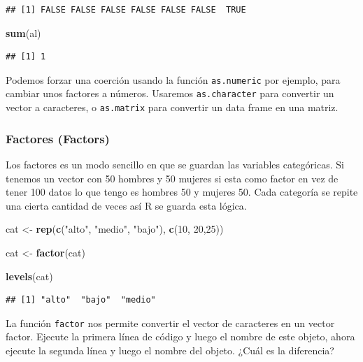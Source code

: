 \documentclass[]{article}
\newenvironment{Shaded}{\begin{snugshade}}{\end{snugshade}}
\newcommand{\KeywordTok}[1]{\textcolor[rgb]{0.13,0.29,0.53}{\textbf{{#1}}}}
\newcommand{\DecValTok}[1]{\textcolor[rgb]{0.00,0.00,0.81}{{#1}}}
\newcommand{\StringTok}[1]{\textcolor[rgb]{0.31,0.60,0.02}{{#1}}}
\newcommand{\NormalTok}[1]{{#1}}
\begin{document}
\begin{verbatim}
## [1] FALSE FALSE FALSE FALSE FALSE FALSE  TRUE
\end{verbatim}

\begin{Shaded}
\begin{Highlighting}[]
\KeywordTok{sum}\NormalTok{(al)}
\end{Highlighting}
\end{Shaded}

\begin{verbatim}
## [1] 1
\end{verbatim}

Podemos forzar una coerción usando la función \texttt{as.numeric} por
ejemplo, para cambiar unos factores a números. Usaremos
\texttt{as.character} para convertir un vector a caracteres, o
\texttt{as.matrix} para convertir un data frame en una matriz.

\subsubsection{Factores (Factors)}\label{factores-factors}

Los factores es un modo sencillo en que se guardan las variables
categóricas. Si tenemos un vector con 50 hombres y 50 mujeres si esta
como factor en vez de tener 100 datos lo que tengo es hombres 50 y
mujeres 50. Cada categoría se repite una cierta cantidad de veces así R
se guarda esta lógica.

\begin{Shaded}
\begin{Highlighting}[]
\NormalTok{cat <-}\StringTok{ }\KeywordTok{rep}\NormalTok{(}\KeywordTok{c}\NormalTok{(}\StringTok{"alto"}\NormalTok{, }\StringTok{"medio"}\NormalTok{, }\StringTok{"bajo"}\NormalTok{), }\KeywordTok{c}\NormalTok{(}\DecValTok{10}\NormalTok{, }\DecValTok{20}\NormalTok{,}\DecValTok{25}\NormalTok{))}

\NormalTok{cat <-}\StringTok{ }\KeywordTok{factor}\NormalTok{(cat) }

\KeywordTok{levels}\NormalTok{(cat)}
\end{Highlighting}
\end{Shaded}

\begin{verbatim}
## [1] "alto"  "bajo"  "medio"
\end{verbatim}

La función \texttt{factor} nos permite convertir el vector de caracteres
en un vector factor. Ejecute la primera línea de código y luego el
nombre de este objeto, ahora ejecute la segunda línea y luego el nombre
del objeto. ¿Cuál es la diferencia?
\end{document}
